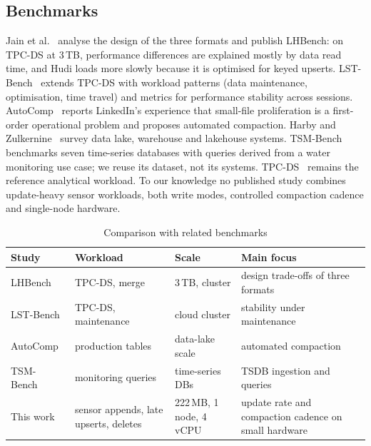 \documentclass[conference]{IEEEtran}
\begin{document}
\subsection{Benchmarks}
Jain et al.~\cite{jain2023lhbench} analyse the design of the three formats and publish LHBench: on TPC-DS at 3\,TB,
performance differences are explained mostly by data read time, and Hudi loads more slowly because it is optimised for
keyed upserts. LST-Bench~\cite{camacho2024lstbench} extends TPC-DS with workload patterns (data maintenance,
optimisation, time travel) and metrics for performance stability across sessions. AutoComp~\cite{gruenheid2025autocomp}
reports LinkedIn's experience that small-file proliferation is a first-order operational problem and proposes
automated compaction. Harby and Zulkernine~\cite{harby2025survey} survey data lake, warehouse and lakehouse systems.
TSM-Bench~\cite{khelifati2023tsmbench} benchmarks seven time-series databases with queries derived from a water
monitoring use case; we reuse its dataset, not its systems. TPC-DS~\cite{nambiar2006tpcds} remains the reference
analytical workload. To our knowledge no published study combines update-heavy sensor workloads, both write modes,
controlled compaction cadence and single-node hardware.

\begin{table}[!t]\centering
\caption{Comparison with related benchmarks}\label{tab:related}
\footnotesize\setlength{\tabcolsep}{3pt}
\begin{tabular}{@{}p{1.75cm}p{2.15cm}p{1.75cm}p{2.5cm}@{}}\toprule
Study & Workload & Scale & Main focus\\\midrule
LHBench~\cite{jain2023lhbench} & TPC-DS, merge & 3\,TB, cluster & design trade-offs of three formats\\
LST-Bench~\cite{camacho2024lstbench} & TPC-DS, maintenance & cloud cluster & stability under maintenance\\
AutoComp~\cite{gruenheid2025autocomp} & production tables & data-lake scale & automated compaction\\
TSM-Bench~\cite{khelifati2023tsmbench} & monitoring queries & time-series DBs & TSDB ingestion and queries\\
This work & sensor appends, late upserts, deletes & 222\,MB, 1 node, 4 vCPU & update rate and compaction cadence on small hardware\\\bottomrule
\end{tabular}
\end{table}
\end{document}
